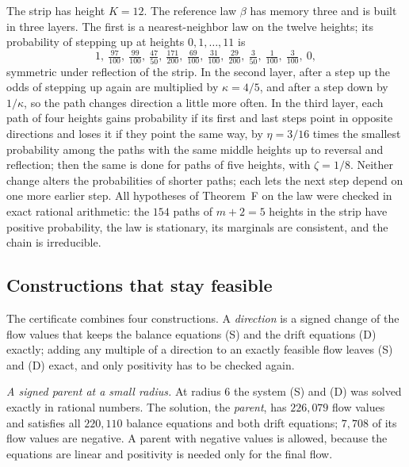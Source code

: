 The strip has height $K=12$. The reference law $\beta$ has memory three and is built in three layers. The first is a nearest-neighbor
law on the twelve heights; its probability of stepping up at heights $0,1,\ldots,11$ is
\[ 1,\ \tfrac{97}{100},\ \tfrac{99}{100},\ \tfrac{47}{50},\ \tfrac{171}{200},\ \tfrac{69}{100},\
   \tfrac{31}{100},\ \tfrac{29}{200},\ \tfrac{3}{50},\ \tfrac{1}{100},\ \tfrac{3}{100},\ 0, \]
symmetric under reflection of the strip. In the second layer, after a step up the odds of stepping up again are
multiplied by $\kappa=4/5$, and after a step down by $1/\kappa$, so the path changes direction a little more often.
In the third layer, each path of four heights gains probability if its first and last steps point in opposite
directions and loses it if they point the same way, by $\eta=3/16$ times the smallest probability among the paths
with the same middle heights up to reversal and reflection; then the same is done for paths of five heights, with
$\zeta=1/8$. Neither change alters the probabilities of shorter paths; each lets the next step depend on one more
earlier step. All hypotheses of Theorem~F on the law were checked in exact rational
arithmetic: the $154$ paths of $m+2=5$ heights in the strip have positive probability, the law is stationary, its
marginals are consistent, and the chain is irreducible.

\subsection{Constructions that stay feasible}

The certificate combines four constructions. A \emph{direction} is a signed change of the flow values that keeps the
balance equations (S) and the drift equations (D) exactly; adding any multiple of a direction to an exactly feasible
flow leaves (S) and (D) exact, and only positivity has to be checked again.

\emph{A signed parent at a small radius.} At radius $6$ the system (S) and (D) was solved exactly in rational numbers.
The solution, the \emph{parent}, has $226{,}079$ flow values and satisfies all $220{,}110$ balance equations and both
drift equations; $7{,}708$ of its flow values are negative. A parent with negative values is allowed, because the
equations are linear and positivity is needed only for the final flow.


